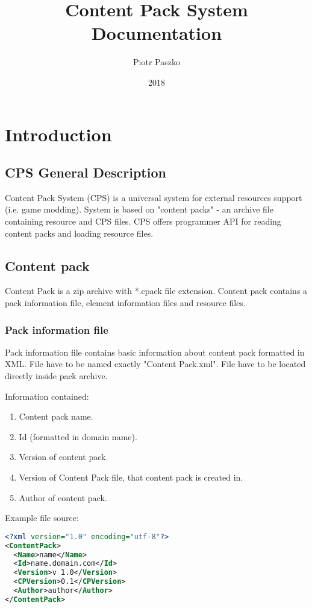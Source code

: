 \documentclass[a4paper]{report}
\title{Content Pack System Documentation}
\author{Piotr Paszko}
\date{2018}
\begin{document}
\maketitle

\tableofcontents

\chapter{Introduction}
\section{CPS General Description}
Content Pack System (CPS) is a universal system for external resources support (i.e. game modding). System is based on "content packs" - an archive file containing resource and CPS files. CPS offers programmer API for reading content packs and loading resource files.

\section{Content pack}
Content Pack is a zip archive with *.cpack file extension. Content pack contains a pack information file, element information files and resource files.

\subsection{Pack information file}
Pack information file contains basic information about content pack formatted in XML. File have to be named exactly "Content Pack.xml". File have to be located directly inside pack archive.

Information contained:
\begin{enumerate}
\item Content pack name.
\item Id (formatted in domain name).
\item Version of content pack.
\item Version of Content Pack file, that content pack is created in.
\item Author of content pack.
\end{enumerate}

Example file source:
\begin{lstlisting}[language=XML]
<?xml version="1.0" encoding="utf-8"?>
<ContentPack>
  <Name>name</Name>
  <Id>name.domain.com</Id>
  <Version>v 1.0</Version>
  <CPVersion>0.1</CPVersion>
  <Author>author</Author>
</ContentPack>
\end{lstlisting}
\end{document}
